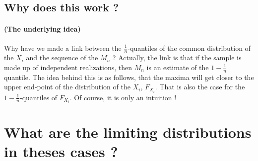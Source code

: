 \subsection{Why does this work ?}
\paragraph{(The underlying idea)}
Why have we made a link between the $\frac{1}{n}$-quantiles of the common distribution of the $X_i$ and the sequence of the $M_n$ ? Actually, the link is that if the sample is made up of independent realizations, then $M_n$ is an estimate of the $1 - \frac{1}{n}$ quantile. \newline
The idea behind this is as follows, that the maxima will get closer to the upper end-point of the distribution of the $X_i$, $F_{X_i}$. That is also the case for the $1 - \frac{1}{n}$-quantiles of $F_{X_i}$. Of course, it is only an intuition !
\section{What are the limiting distributions in theses cases ?}
